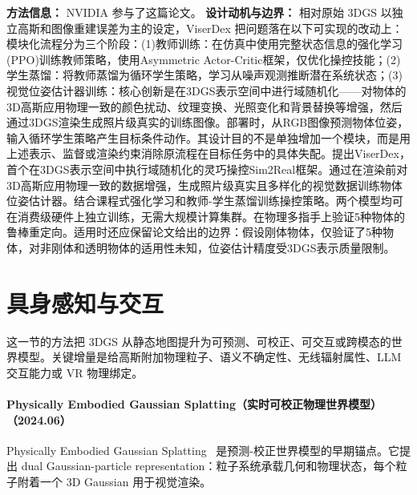 \textbf{方法信息：} NVIDIA 参与了这篇论文。
\textbf{设计动机与边界：} 相对原始 3DGS 以独立高斯和图像重建误差为主的设定，ViserDex 把问题落在以下可实现的改动上：模块化流程分为三个阶段：(1)教师训练：在仿真中使用完整状态信息的强化学习(PPO)训练教师策略，使用Asymmetric Actor-Critic框架，仅优化操控技能；(2)学生蒸馏：将教师蒸馏为循环学生策略，学习从噪声观测推断潜在系统状态；(3)视觉位姿估计器训练：核心创新是在3DGS表示空间中进行域随机化——对物体的3D高斯应用物理一致的颜色扰动、纹理变换、光照变化和背景替换等增强，然后通过3DGS渲染生成照片级真实的训练图像。部署时，从RGB图像预测物体位姿，输入循环学生策略产生目标条件动作。其设计目的不是单独增加一个模块，而是用上述表示、监督或渲染约束消除原流程在目标任务中的具体失配。提出ViserDex，首个在3DGS表示空间中执行域随机化的灵巧操控Sim2Real框架。通过在渲染前对3D高斯应用物理一致的数据增强，生成照片级真实且多样化的视觉数据训练物体位姿估计器。结合课程式强化学习和教师-学生蒸馏训练操控策略。两个模型均可在消费级硬件上独立训练，无需大规模计算集群。在物理多指手上验证5种物体的鲁棒重定向。适用时还应保留论文给出的边界：假设刚体物体，仅验证了5种物体，对非刚体和透明物体的适用性未知，位姿估计精度受3DGS表示质量限制。

\section{具身感知与交互}

这一节的方法把 3DGS 从静态地图提升为可预测、可校正、可交互或跨模态的世界模型。关键增量是给高斯附加物理粒子、语义不确定性、无线辐射属性、LLM 交互能力或 VR 物理绑定。
\paragraph{Physically Embodied Gaussian Splatting（实时可校正物理世界模型）（2024.06）}
Physically Embodied Gaussian Splatting~\cite{2406_10788} 是预测-校正世界模型的早期锚点。它提出 dual Gaussian-particle representation：粒子系统承载几何和物理状态，每个粒子附着一个 3D Gaussian 用于视觉渲染。

